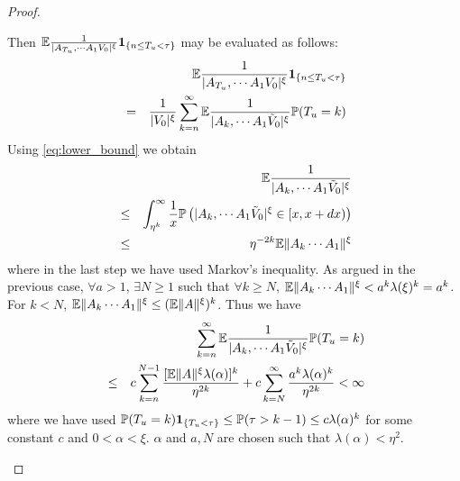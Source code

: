 \documentclass{article}
\begin{document}
\begin{proof}
\begin{enumerate}
\begin{equation}
    \end{equation}
    Then $\mathbb{E} {1 \over |A_{T_u}, \cdots A_1 V_0|^{\xi}}\mathbf{1}_{\{n \leq T_u <
      \tau\}}$ may be evaluated as follows:
    \begin{eqnarray*}
      && \mathbb{E} {1 \over |A_{T_u}, \cdots A_1 V_0|^\xi} \mathbf{1}_{\{n \leq T_u < \tau\}}\\
      &=& {1 \over |V_0|^{\xi}} \sum_{k=n}^\infty \mathbb{E} {1 \over |A_k,
        \cdots A_1 \tilde V_0|^{\xi}} \mathbb{P}(T_u = k)
    \end{eqnarray*}
    Using \eqref{eq:lower_bound} we obtain
    \begin{eqnarray*}
      && \mathbb{E} {1 \over |A_k, \cdots A_1 \tilde V_0|^{\xi}}  \\
      &\leq& \int_{\eta^k}^\infty {1 \over x} \mathbb{P}\left(
        |A_k, \cdots A_1 \tilde V_0|^{\xi} \in [x, x+ dx)
      \right) \\
      &\leq& \eta^{-2k} \mathbb{E} \|A_k \cdots A_1\|^\xi 
    \end{eqnarray*}
    where in the last step we have used Markov's inequality. As argued
    in the previous case, $\forall a > 1$, $\exists N \geq 1$ such
    that $\forall k \geq N$, $\mathbb{E} \|A_k \cdots A_1\|^\xi < a^k
    \lambda(\xi)^k = a^k$. For $k < N$, $\mathbb{E} \|A_k \cdots A_1\|^\xi
     \leq (\mathbb{E}\|A\|^\xi)^k$. Thus we have
    \begin{eqnarray*}
      && \sum_{k=n}^\infty \mathbb{E} {1 \over |A_k, \cdots A_1 \tilde
        V_0|^{\xi}}  \mathbb{P}(T_u = k) \\
      &\leq& c \sum_{k=n}^{N-1} {
        [\mathbb{E} \|A\|^\xi \lambda(\alpha)]^k
        \over \eta^{2k}
      } + c \sum_{k=N}^\infty {
        a^k \lambda(\alpha)^k
        \over \eta^{2k}
      } < \infty
    \end{eqnarray*}
    where we have used $\mathbb{P}(T_u = k)\mathbf{1}_{\{T_u < \tau\}} \leq \mathbb{P}(\tau > k-1)
    \leq c \lambda(\alpha)^k$ for some constant $c$ and $0 < \alpha <
    \xi$. $\alpha$ and $a, N$ are chosen such that $\lambda(\alpha) <
    \eta^2$.
  \end{enumerate}
\end{proof}




\end{document}
